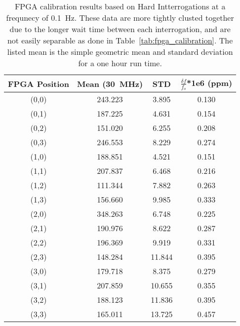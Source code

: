 \begin{table}
	\begin{center}
		\begin{tabular}{|c|c|c|c|}
			\hline
			FPGA Position & Mean (30~\unit{MHz}) & STD & $\frac{\delta f}{f_{o}}$*1e6 (ppm) \\
			\hline
			(0,0) & 243.223 & 3.895 & 0.130 \\
			\hline
			(0,1) & 187.225 & 4.631 & 0.154 \\
			\hline
			(0,2) & 151.020 & 6.255 & 0.208 \\
			\hline
			(0,3) & 246.553 & 8.229 & 0.274 \\
			\hline
			(1,0) & 188.851 & 4.521 & 0.151 \\
			\hline
			(1,1) & 207.837 & 6.468 & 0.216 \\
			\hline
			(1,2) & 111.344 & 7.882 & 0.263 \\
			\hline
			(1,3) & 156.660 & 9.985 & 0.333 \\
			\hline
			(2,0) & 348.263 & 6.748 & 0.225 \\
			\hline
			(2,1) & 190.976 & 8.622 & 0.287 \\
			\hline
			(2,2) & 196.369 & 9.919 & 0.331 \\
			\hline
			(2,3) & 148.284 & 11.844 & 0.395 \\
			\hline
			(3,0) & 179.718 & 8.375 & 0.279 \\
			\hline
			(3,1) & 207.859 & 10.655 & 0.355 \\
			\hline
			(3,2) & 188.123 & 11.836 & 0.395 \\
			\hline
			(3,3) & 165.011 & 13.725 & 0.457 \\
			\hline
		\end{tabular}
	\end{center}
	\caption{FPGA calibration results based on Hard Intterrogations at a frequnecy of 0.1~\unit{Hz}.
	These data are more tightly clusted together due to the longer wait time between each interrogation, and are not easily separable as done in Table~\ref{tab:fpga_calibration}.
	The listed mean is the simple geometric mean and standard deviation for a one hour run time.
	}
	\label{tab:fpga_slow_calibration}
\end{table}